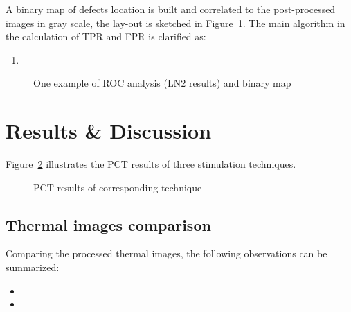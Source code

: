 \documentclass[]{spie}  %
\begin{document}
A binary map of defects location is built and correlated to the post-processed images in gray scale, the lay-out is sketched in Figure~\ref{binary}. The main algorithm in the calculation of TPR and FPR is clarified as:
\begin{enumerate}
   \item 
\end{enumerate}


\begin{figure}[ht]
   \centering
   \caption{One example of ROC analysis (LN2 results) and binary map}
   \label{binary}
\end{figure}



\section{Results \& Discussion} %
\label{sec:results_&_discussion}
Figure~\ref{PCT_result} illustrates the PCT results of three stimulation techniques.
\begin{figure}[ht]
    \centering
    \hspace{10pt}
    \hspace{10pt}
    \hspace{10pt}
    \hspace{10pt}
    \caption{PCT results of corresponding technique}
    \label{PCT_result}
\end{figure}

\subsection{Thermal images comparison} 
Comparing the processed thermal images, the following observations can be summarized:  
\begin{itemize}
    \item 
    \item 
\end{itemize}
\end{document}
